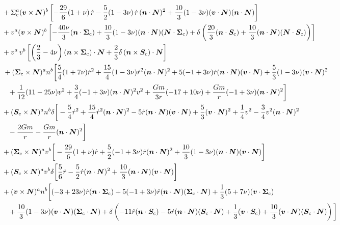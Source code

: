 \documentclass[aps, prd,
twocolumn,%
superscriptaddress,
showpacs, nofootinbib, eqsecnum, amsmath, amssymb, floatfix
]{revtex4}
\begin{document}
\begin{widetext}
\begin{align}
& + \Sigma_{\rm c}^{a} (\bm{v}\times \bm{N})^{b} \left[
-\frac{29}{6}(1+\nu) \, \dot r -
\frac{5}{2} (1-3\nu) \, \dot r \, (\bm{n}\cdot \bm{N})^2+
\frac{10}{3} (1-3\nu) (\bm{v}\cdot \bm{N}) (\bm{n}\cdot \bm{N}) \right]
\nonumber\\
& + v^{a} (\bm{v}\times \bm{N})^{b}\left[
-\frac{40\nu}{3} (\bm{n}\cdot \bm{\Sigma}_{\rm c})+
\frac{10}{3} (1-3\nu)(\bm{n}\cdot \bm{N}) (\bm{N}\cdot \bm{\Sigma}_{\rm c}) +
\delta \left(\frac{20}{3} (\bm{n}\cdot \bm{S}_{\rm c}) +
\frac{10}{3} (\bm{n}\cdot \bm{N})(\bm{N}\cdot \bm{S}_{\rm c}) \right)\right]
\nonumber\\
&+  v^{a} \, v^{b} \left[
 \left(\frac{2}{3}-4\nu\right)(\bm{n}\times \bm{\Sigma}_{\rm c})\cdot \bm{N}+
\frac{2}{3} \delta\,(\bm{n}\times \bm{S}_{\rm c})\cdot \bm{N}
\right]\nonumber\\
&\, +({\bm\Sigma}_{\rm c} \times
\bm{N})^{a}n^{b}\bigg[\frac{5}{4}(1+7\nu)\dot r^2+\frac{15}{4}(1-3\nu)\dot
r^2(\bm{n}\cdot \bm{N})^2+5(-1+3\nu)\dot r(\bm{n}\cdot \bm{N})(\bm{v}\cdot
\bm{N})+\frac{5}{3}(1-3\nu)(\bm{v}\cdot \bm{N})^2\nonumber\\
& \; \; \; +\frac{1}{12}(11-25\nu)v^2+\frac{3}{4}(-1+3\nu)(\bm{n}\cdot
\bm{N})^2 v^2
+\frac{G m}{3r}(-17+10\nu)+\frac{G m}{r}(-1+3\nu)(\bm{n}\cdot
\bm{N})^2\bigg]\nonumber\\
&  +({\bm S}_{\rm c}\times \bm{N})^{a}{n}^{b}\delta\bigg[-\frac{5}{4}\dot
r^2+\frac{15}{4}\dot r^2({\bm n}\cdot \bm{N})^2-5\dot r ({\bm n}\cdot
\bm{N})({\bm v}\cdot \bm{N})+\frac{5}{3}({\bm v}\cdot
\bm{N})^2+\frac{1}{4}v^2-\frac{3}{4}v^2 ({\bm n}\cdot \bm{N})^2\nonumber\\
& \; \; \; -\frac{2G m}{r}-
\frac{G m}{r}({\bm n}\cdot \bm{N})^2\bigg]\nonumber\\
&+(\bm{\Sigma}_{\rm c}\times \bm{N})^{a}v^{b}\bigg[-\frac{29}{6}(1+\nu)\dot
r+\frac{5}{2}(-1+3\nu)\dot r(\bm{n}\cdot
\bm{N})^2+\frac{10}{3}(1-3\nu)(\bm{n}\cdot \bm{N})(\bm{v}\cdot
\bm{N})\bigg]\nonumber\\
&  +(\bm{S}_{\rm c}\times \bm{N})^{a}v^{b}\delta\bigg[\frac{5}{6}\dot
r-\frac{5}{2}\dot r (\bm{n}\cdot \bm{N})^2+\frac{10}{3}(\bm{n}\cdot
\bm{N})(\bm{v}\cdot \bm{N})\bigg]\nonumber\\
& +(\bm{v}\times \bm{N})^{a}n^{b}\bigg[(-3+23 \nu)\dot r (\bm{n}\cdot
\bm{\Sigma}_{\rm c})+5(-1+3\nu) \dot r(\bm{n}\cdot \bm{N})(\bm{\Sigma}_{\rm
  c}\cdot \bm{N})%
+\frac{1}{3}(5+7\nu) (\bm{v}\cdot \bm{\Sigma}_{\rm c})\nonumber\\
& \; \; \; +\frac{10}{3}(1-3\nu)(\bm {v}\cdot \bm{N})(\bm{\Sigma}_{\rm
  c}\cdot \bm{N})+ \delta \left(-11\dot r (\bm{n}\cdot \bm{S}_{\rm c})-5 \dot
  r (\bm{n}\cdot \bm{N})(\bm{S}_{\rm c}\cdot \bm{N})%
+\frac{1}{3}(\bm{v}\cdot \bm{S}_{\rm
  c})+\frac{10}{3}(\bm{v}\cdot\bm{N})(\bm{S}_{\rm c}\cdot \bm{N})\right)
\bigg] \ \ \ \ \ \
\end{align}
\end{widetext}
\end{document}
